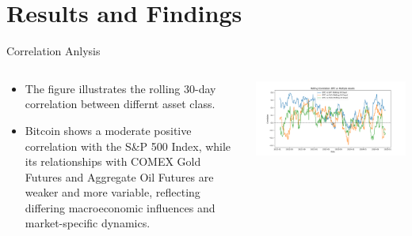 \section{Results and Findings}
    

    \begin{frame}{Correlation Anlysis}
        \begin{columns}
        \begin{column}{0.5\textwidth}
        \begin{itemize}
            \item<1-> The figure illustrates the rolling 30-day correlation between differnt asset class.
            \item<2-> Bitcoin shows a moderate positive correlation with the S\&P 500 Index, while its relationships with COMEX Gold Futures and Aggregate Oil Futures are weaker and more variable, reflecting differing macroeconomic influences and market-specific dynamics.
           
        \end{itemize}
        \end{column}
        \begin{column}{0.6\textwidth}  %
            \begin{center}
             \includegraphics[width=\textwidth]{../../figure/rolling_correlation_multi.png}
             \end{center}
        \end{column}
        \end{columns}
    \end{frame}

